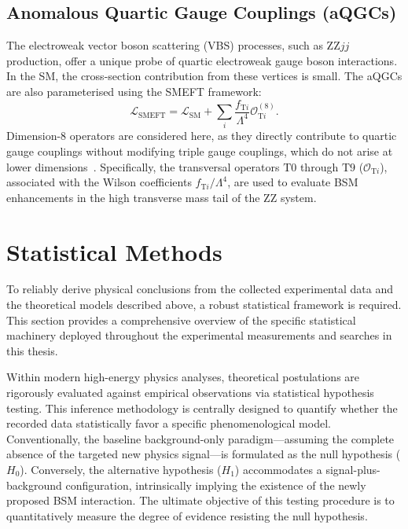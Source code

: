 \subsection{Anomalous Quartic Gauge Couplings (aQGCs)}
\label{subsec:theory_aqgc}

The electroweak vector boson scattering (VBS) processes, such as $\text{ZZ}jj$ production, offer a unique probe of quartic electroweak gauge boson interactions. In the SM, the cross-section contribution from these vertices is small. The aQGCs are also parameterised using the SMEFT framework:
\begin{equation}
    \mathcal{L}_{\text{SMEFT}} = \mathcal{L}_{\text{SM}} + \sum_i \frac{f_{\text{T}i}}{\Lambda^4} \mathcal{O}_{\text{T}i}^{(8)}.
\label{eq:smeft_aqgc}
\end{equation}
Dimension-8 operators are considered here, as they directly contribute to quartic gauge couplings without modifying triple gauge couplings, which do not arise at lower dimensions~\cite{Eboli2016}. Specifically, the transversal operators $\text{T}0$ through $\text{T}9$ ($\mathcal{O}_{\text{T}i}$), associated with the Wilson coefficients $f_{\text{T}i}/\Lambda^4$, are used to evaluate BSM enhancements in the high transverse mass tail of the $\text{ZZ}$ system.


\section{Statistical Methods}
\label{sec:theory_stats}

To reliably derive physical conclusions from the collected experimental data and the theoretical models described above, a robust statistical framework is required. This section provides a comprehensive overview of the specific statistical machinery deployed throughout the experimental measurements and searches in this thesis.

Within modern high-energy physics analyses, theoretical postulations are rigorously evaluated against empirical observations via statistical hypothesis testing. This inference methodology is centrally designed to quantify whether the recorded data statistically favor a specific phenomenological model. Conventionally, the baseline background-only paradigm—assuming the complete absence of the targeted new physics signal—is formulated as the null hypothesis ($H_0$). Conversely, the alternative hypothesis ($H_1$) accommodates a signal-plus-background configuration, intrinsically implying the existence of the newly proposed BSM interaction. The ultimate objective of this testing procedure is to quantitatively measure the degree of evidence resisting the null hypothesis.

